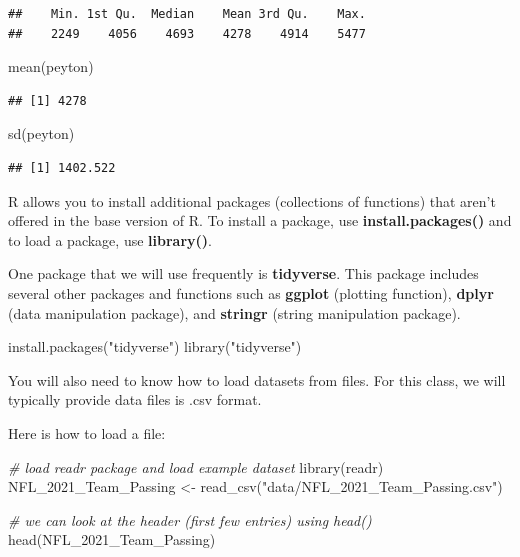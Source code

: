 \documentclass[
  11pt,
]{book}
\newenvironment{Shaded}{\begin{snugshade}}{\end{snugshade}}
\newcommand{\CommentTok}[1]{\textcolor[rgb]{0.56,0.35,0.01}{\textit{#1}}}
\newcommand{\FunctionTok}[1]{\textcolor[rgb]{0.00,0.00,0.00}{#1}}
\newcommand{\NormalTok}[1]{#1}
\newcommand{\OtherTok}[1]{\textcolor[rgb]{0.56,0.35,0.01}{#1}}
\newcommand{\StringTok}[1]{\textcolor[rgb]{0.31,0.60,0.02}{#1}}
\theoremstyle{definition}
\theoremstyle{definition}
\theoremstyle{definition}
\theoremstyle{definition}
\theoremstyle{remark}
\begin{document}
\begin{verbatim}
##    Min. 1st Qu.  Median    Mean 3rd Qu.    Max. 
##    2249    4056    4693    4278    4914    5477
\end{verbatim}

\begin{Shaded}
\begin{Highlighting}[]
\FunctionTok{mean}\NormalTok{(peyton)}
\end{Highlighting}
\end{Shaded}

\begin{verbatim}
## [1] 4278
\end{verbatim}

\begin{Shaded}
\begin{Highlighting}[]
\FunctionTok{sd}\NormalTok{(peyton)}
\end{Highlighting}
\end{Shaded}

\begin{verbatim}
## [1] 1402.522
\end{verbatim}

R allows you to install additional packages (collections of functions) that aren't offered in the base version of R. To install a package, use \textbf{install.packages()} and to load a package, use \textbf{library()}.

One package that we will use frequently is \textbf{tidyverse}. This package includes several other packages and functions such as \textbf{ggplot} (plotting function), \textbf{dplyr} (data manipulation package), and \textbf{stringr} (string manipulation package).

\begin{Shaded}
\begin{Highlighting}[]
\FunctionTok{install.packages}\NormalTok{(}\StringTok{"tidyverse"}\NormalTok{)}
\FunctionTok{library}\NormalTok{(}\StringTok{"tidyverse"}\NormalTok{)}
\end{Highlighting}
\end{Shaded}

You will also need to know how to load datasets from files. For this class, we will typically provide data files is .csv format.

Here is how to load a file:

\begin{Shaded}
\begin{Highlighting}[]
\CommentTok{\# load readr package and load example dataset}
\FunctionTok{library}\NormalTok{(readr)}
\NormalTok{NFL\_2021\_Team\_Passing }\OtherTok{\textless{}{-}} \FunctionTok{read\_csv}\NormalTok{(}\StringTok{"data/NFL\_2021\_Team\_Passing.csv"}\NormalTok{)}

\CommentTok{\# we can look at the header (first few entries) using \textquotesingle{}head()\textquotesingle{}}
\FunctionTok{head}\NormalTok{(NFL\_2021\_Team\_Passing)}
\end{Highlighting}
\end{Shaded}
\end{document}
